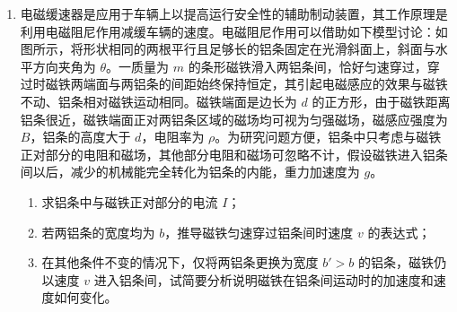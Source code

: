 \documentclass[\gkver]{gaokaozhenti}
\begin{document}
\begin{enumerate}
{设小球在重力与电场力的合力方向上分位移为 $y$，有 $y = \frac{1}{2} at^{2}$ ⑦

$a$ 与 $mg$ 的夹角和 $v$ 与 $E$ 的夹角相同，均为 $\theta$，又 $\tan\theta=\frac{y}{x}$ ⑧

联立④⑤⑥⑦⑧式，代入数据解得 $t=2\sqrt{3}\Us=3.5\Us$ ⑨

解法二：撤去磁场后，由于电场力垂直于竖直方向，它对竖直方向的分运动没有影响，以 P 点为坐标原点，竖直向上为正方向，小球在竖直方向上做匀减速运动，其初速度为 $v_{0}=v\sin\theta$

若使小球再次穿过 P 点所在的电场线，仅需小球的竖直方向上分位移为零，则有 $v_{0}t - \frac{1}{2}gt^{2} = 0$

联立⑤⑥式，代入数据解得 $t=2\sqrt{3}\Us=3.5\Us$ ⑦。
}

\item
电磁缓速器是应用于车辆上以提高运行安全性的辅助制动装置，其工作原理是利用电磁阻尼作用减缓车辆的速度。电磁阻尼作用可以借助如下模型讨论：如图所示，将形状相同的两根平行且足够长的铝条固定在光滑斜面上，斜面与水平方向夹角为 $\theta$。一质量为 $m$ 的条形磁铁滑入两铝条间，恰好匀速穿过，穿过时磁铁两端面与两铝条的间距始终保持恒定，其引起电磁感应的效果与磁铁不动、铝条相对磁铁运动相同。磁铁端面是边长为 $d$ 的正方形，由于磁铁距离铝条很近，磁铁端面正对两铝条区域的磁场均可视为匀强磁场，磁感应强度为 $B$，铝条的高度大于 $d$，电阻率为 $\rho$。为研究问题方便，铝条中只考虑与磁铁正对部分的电阻和磁场，其他部分电阻和磁场可忽略不计，假设磁铁进入铝条间以后，减少的机械能完全转化为铝条的内能，重力加速度为 $g$。
\begin{enumerate}
	\item
	求铝条中与磁铁正对部分的电流 $I$；
	\item
	若两铝条的宽度均为 $b$，推导磁铁匀速穿过铝条间时速度 $v$ 的表达式；
	\item
	在其他条件不变的情况下，仅将两铝条更换为宽度 $b'>b$ 的铝条，磁铁仍以速度 $v$ 进入铝条间，试简要分析说明磁铁在铝条间运动时的加速度和速度如何变化。
\end{enumerate}

\end{enumerate}
\end{document}
